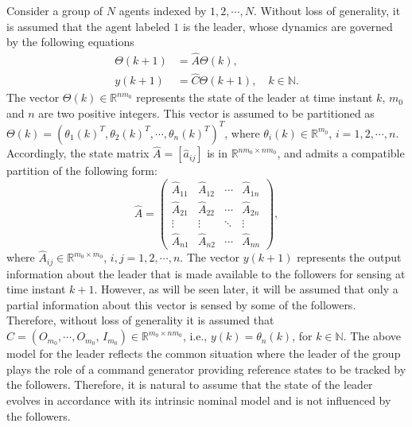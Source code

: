 \documentclass[a4paper,10pt,onecolumn]{article}
\begin{document}
Consider a group of $N$ agents indexed by $1,2,\cdots,N$. Without loss of
generality, it is assumed that the agent labeled $1$ is the leader,
whose dynamics are governed by the following equations
\begin{equation}\label{LeaderDynamics}
\begin{aligned}
\Theta(k+1)&=\hat{A}\Theta(k), \\
y(k+1)&=\hat{C}\Theta(k+1),\quad k\in \mathbb{N}.
\end{aligned}
\end{equation}
The vector $\Theta(k)\in \mathbb{R}^{nm_{0}}$ represents the state of the
leader at time instant $k$, $m_{0}$ and
$n$ are two positive integers. This vector is assumed to be partitioned as
$\Theta(k)=(\theta_{1}(k)^{T},\theta_{2}(k)^{T},\cdots,\theta_{n}(k)^{T})^{T}$,
where
$\theta_{i}(k)\in \mathbb{R}^{m_{0}}$, $i=1,2,\cdots,n$. Accordingly, the state matrix
$\hat{A}=[\hat{a}_{ij}]$ is in $\mathbb{R}^{nm_{0} \times nm_{0}}$, and
admits a compatible partition of the following form:
\begin{equation}\label{partition}
\hat{A}=\left(\begin{array}{cccc}
\hat{A}_{11}&\hat{A}_{12}&\cdots&\hat{A}_{1n}\\
\hat{A}_{21}&\hat{A}_{22}&\cdots&\hat{A}_{2n}\\
\vdots&\vdots&\ddots&\vdots\\
\hat{A}_{n1}&\hat{A}_{n2}&\cdots&\hat{A}_{nn}
\end{array}\right),
\end{equation}
where $\hat{A}_{ij}\in \mathbb{R}^{m_{0}\times m_{0}}$, $i,j=1,2,\cdots,n$.
The vector $y(k+1)$ represents the output information about the leader that
is made available to the followers for sensing  at time instant
$k+1$. However, as will be seen later, it will be assumed that only a
partial information about this vector is sensed by some of the
followers. Therefore, without loss of generality it is assumed that
$\hat{C}=(O_{m_{0}},\cdots,O_{m_{0}},\,I_{m_{0}})\in 
\mathbb{R}^{m_{0}\times nm_{0}}$, i.e., $y(k)=\theta_{n}(k)$, for $k\in
\mathbb{N}$.
The above model for the leader reflects the common situation where the
leader of the group plays the role of a command generator providing
reference states to be tracked by the followers. Therefore, it is natural
to assume that the state of the leader evolves in accordance with its
intrinsic nominal model and is not influenced by the followers.
\end{document}
